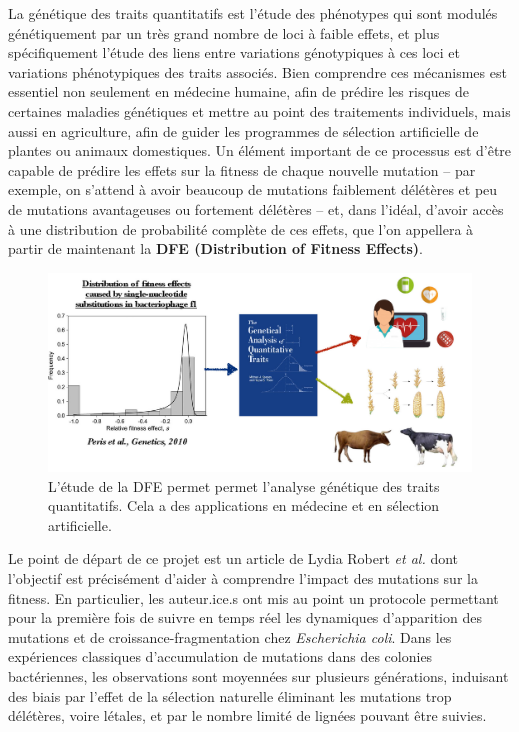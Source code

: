 \documentclass[12pt]{article}
\begin{document}
La génétique des traits quantitatifs \cite{mac} est l'étude des phénotypes qui sont modulés génétiquement par un très grand nombre de loci à faible effets, et plus spécifiquement l'étude des liens entre variations génotypiques à ces loci et variations phénotypiques des traits associés. Bien comprendre ces mécanismes est essentiel non seulement en médecine humaine, afin de prédire les risques de certaines maladies génétiques et mettre au point des traitements individuels, mais aussi en agriculture, afin de guider les programmes de sélection artificielle de plantes ou animaux domestiques. Un élément important de ce processus est d'être capable de prédire les effets sur la fitness de chaque nouvelle mutation -- par exemple, on s'attend à avoir beaucoup de mutations faiblement délétères et peu de mutations avantageuses ou fortement délétères -- et, dans l'idéal, d'avoir accès à une distribution de probabilité complète de ces effets, que l'on appellera à partir de maintenant la \textbf{DFE (Distribution of Fitness Effects)}.

\begin{figure}[h]
 \begin{center}
	\vspace{3mm}
	\includegraphics[scale=0.25]{../Img/DFE_phage_2010.jpg}
\end{center} 
  \caption{L'étude de la DFE permet permet l'analyse génétique des traits quantitatifs. Cela a des applications en médecine et en sélection artificielle.}
\end{figure}

Le point de départ de ce projet est un article de Lydia Robert \textit{et al.} \cite{rob} dont l'objectif est précisément d'aider à comprendre l’impact des mutations sur la fitness. En particulier, les auteur.ice.s ont mis au point un protocole permettant pour la première fois de suivre en temps réel les dynamiques d’apparition des mutations et de croissance-fragmentation chez \textit{Escherichia coli}. Dans les expériences classiques d’accumulation de mutations dans des colonies bactériennes, les observations sont moyennées sur plusieurs générations, induisant des biais par l’effet de la sélection naturelle éliminant les mutations trop délétères, voire létales, et par le nombre limité de lignées pouvant être suivies. 
\end{document}
